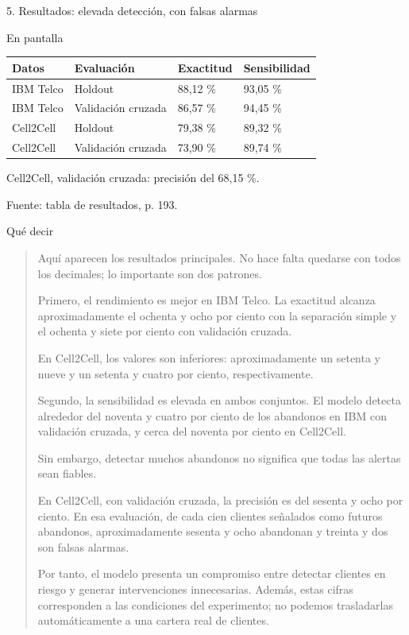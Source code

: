 \documentclass[presentation]{beamer}
\begin{document}
\begin{frame}[label={sec:orgced450e}]{5. Resultados: elevada detección, con falsas alarmas}
\begin{block}{En pantalla}
\begin{center}
\begin{tabular}{llll}
Datos & Evaluación & Exactitud & Sensibilidad\\
\hline
IBM Telco & Holdout & 88,12 \% & 93,05 \%\\
IBM Telco & Validación cruzada & 86,57 \% & 94,45 \%\\
Cell2Cell & Holdout & 79,38 \% & 89,32 \%\\
Cell2Cell & Validación cruzada & 73,90 \% & 89,74 \%\\
\end{tabular}
\end{center}

Cell2Cell, validación cruzada: precisión del \alert{68,15 \%}.

Fuente: tabla de resultados, p. 193.
\end{block}
\begin{block}{Qué decir}
\begin{quote}
Aquí aparecen los resultados principales. No hace falta quedarse con todos los decimales; lo importante son dos patrones.

Primero, el rendimiento es mejor en IBM Telco. La exactitud alcanza aproximadamente el ochenta y ocho por ciento con la separación simple y el ochenta y siete por ciento con validación cruzada.

En Cell2Cell, los valores son inferiores: aproximadamente un setenta y nueve y un setenta y cuatro por ciento, respectivamente.

Segundo, la sensibilidad es elevada en ambos conjuntos. El modelo detecta alrededor del noventa y cuatro por ciento de los abandonos en IBM con validación cruzada, y cerca del noventa por ciento en Cell2Cell.

Sin embargo, detectar muchos abandonos no significa que todas las alertas sean fiables.

En Cell2Cell, con validación cruzada, la precisión es del sesenta y ocho por ciento. En esa evaluación, de cada cien clientes señalados como futuros abandonos, aproximadamente sesenta y ocho abandonan y treinta y dos son falsas alarmas.

Por tanto, el modelo presenta un compromiso entre detectar clientes en riesgo y generar intervenciones innecesarias. Además, estas cifras corresponden a las condiciones del experimento; no podemos trasladarlas automáticamente a una cartera real de clientes.
\end{quote}
\end{block}
\end{frame}
\end{document}
